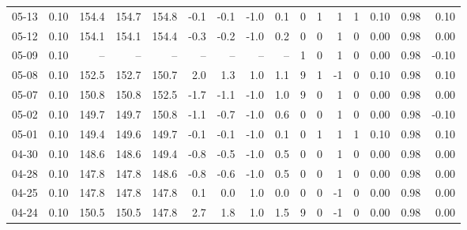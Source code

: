 \begin{threeparttable}
{\begin{tabular}{lrrrrrrrrrrrrrrr}
  05-13 &     0.10 & 154.4 & 154.7 & 154.8 &       -0.1 &           -0.1 &                     -1.0 &                 0.1 &              0 &         1 &     1 &         1 &       0.10 &      0.98 &           0.10 \\
  05-12 &     0.10 & 154.1 & 154.1 & 154.4 &       -0.3 &           -0.2 &                     -1.0 &                 0.2 &              0 &         0 &     1 &         0 &       0.00 &      0.98 &           0.00 \\
  05-09 &     0.10 &    -- &    -- &    -- &         -- &             -- &                       -- &                  -- &              1 &         0 &     1 &         0 &       0.00 &      0.98 &          -0.10 \\
  05-08 &     0.10 & 152.5 & 152.7 & 150.7 &        2.0 &            1.3 &                      1.0 &                 1.1 &              9 &         1 &    -1 &         0 &       0.10 &      0.98 &           0.10 \\
  05-07 &     0.10 & 150.8 & 150.8 & 152.5 &       -1.7 &           -1.1 &                     -1.0 &                 1.0 &              9 &         0 &     1 &         0 &       0.00 &      0.98 &           0.00 \\
  05-02 &     0.10 & 149.7 & 149.7 & 150.8 &       -1.1 &           -0.7 &                     -1.0 &                 0.6 &              0 &         0 &     1 &         0 &       0.00 &      0.98 &          -0.10 \\
  05-01 &     0.10 & 149.4 & 149.6 & 149.7 &       -0.1 &           -0.1 &                     -1.0 &                 0.1 &              0 &         1 &     1 &         1 &       0.10 &      0.98 &           0.10 \\
  04-30 &     0.10 & 148.6 & 148.6 & 149.4 &       -0.8 &           -0.5 &                     -1.0 &                 0.5 &              0 &         0 &     1 &         0 &       0.00 &      0.98 &           0.00 \\
  04-28 &     0.10 & 147.8 & 147.8 & 148.6 &       -0.8 &           -0.6 &                     -1.0 &                 0.5 &              0 &         0 &     1 &         0 &       0.00 &      0.98 &           0.00 \\
  04-25 &     0.10 & 147.8 & 147.8 & 147.8 &        0.1 &            0.0 &                      1.0 &                 0.0 &              0 &         0 &    -1 &         0 &       0.00 &      0.98 &           0.00 \\
  04-24 &     0.10 & 150.5 & 150.5 & 147.8 &        2.7 &            1.8 &                      1.0 &                 1.5 &              9 &         0 &    -1 &         0 &       0.00 &      0.98 &           0.00 \\

\end{tabular}}
\end{threeparttable}
